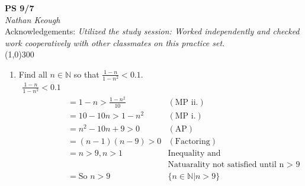 \documentclass[a4paper]{article}
\begin{document}
    \begin{center}
        \Large \textbf{PS 9/7} \\
        \large \textit{Nathan Keough} \\
        Acknowledgements: \emph{Utilized the study session: Worked independently and checked work cooperatively with other classmates on this practice set.} \vspace{.5pc} \\ 
        \line(1,0){300} 
        \vspace{1pc}
    \end{center} 
    
    \begin{flushleft}
        \begin{enumerate}
            \item
            Find all $n\in \mathbb{N}$ so that $\frac{1-n}{1-n^2}<0.1$.
                \begin{align*}
                    \frac{1-n}{1-n^2} < 0.1 & \\
                    &= 1-n > \frac{ 1-n^2}{10} & (\text{MP ii.})\\
                    &= 10 - 10n > 1-n^2 & (\text{MP i.}) \\
                    &= n^2 - 10n + 9 > 0 & (\text{AP}) \\
                    &= (n-1)(n-9) > 0 & (\text{Factoring}) \\
                    &= n > 9, n > 1 & \text{Inequality and}\\
                    && \text{Natuarality not satisfied until n $>$ 9} \\
                    &= \text{So } n>9
                    & \{n\in \mathbb{N} \vert n>9\} \\
                \end{align*}


\end{enumerate}
\end{flushleft}
\end{document}
